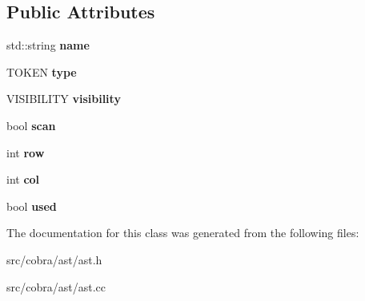 \subsection*{Public Attributes}
\begin{DoxyCompactItemize}
\item 
\hypertarget{class_cobra_1_1internal_1_1_a_s_t_node_a009c5e13135b18c7475bb0bb6e1751e5}{std\+::string {\bfseries name}}\label{class_cobra_1_1internal_1_1_a_s_t_node_a009c5e13135b18c7475bb0bb6e1751e5}

\item 
\hypertarget{class_cobra_1_1internal_1_1_a_s_t_node_a94f2dac0233b841edddeeed35e768868}{T\+O\+K\+E\+N {\bfseries type}}\label{class_cobra_1_1internal_1_1_a_s_t_node_a94f2dac0233b841edddeeed35e768868}

\item 
\hypertarget{class_cobra_1_1internal_1_1_a_s_t_node_a845a463b42877638f089bd1bd2a6c973}{V\+I\+S\+I\+B\+I\+L\+I\+T\+Y {\bfseries visibility}}\label{class_cobra_1_1internal_1_1_a_s_t_node_a845a463b42877638f089bd1bd2a6c973}

\item 
\hypertarget{class_cobra_1_1internal_1_1_a_s_t_node_addf036b6ff25716a32e763328c2f4837}{bool {\bfseries scan}}\label{class_cobra_1_1internal_1_1_a_s_t_node_addf036b6ff25716a32e763328c2f4837}

\item 
\hypertarget{class_cobra_1_1internal_1_1_a_s_t_node_a4b38b68b9d85d0b2756dfb8481a92399}{int {\bfseries row}}\label{class_cobra_1_1internal_1_1_a_s_t_node_a4b38b68b9d85d0b2756dfb8481a92399}

\item 
\hypertarget{class_cobra_1_1internal_1_1_a_s_t_node_acb5d20f5ce2459ca952ac90bf825160d}{int {\bfseries col}}\label{class_cobra_1_1internal_1_1_a_s_t_node_acb5d20f5ce2459ca952ac90bf825160d}

\item 
\hypertarget{class_cobra_1_1internal_1_1_a_s_t_node_a9d670e637b5d9187f037343f9d3fffba}{bool {\bfseries used}}\label{class_cobra_1_1internal_1_1_a_s_t_node_a9d670e637b5d9187f037343f9d3fffba}

\end{DoxyCompactItemize}


The documentation for this class was generated from the following files\+:\begin{DoxyCompactItemize}
\item 
src/cobra/ast/ast.\+h\item 
src/cobra/ast/ast.\+cc\end{DoxyCompactItemize}
